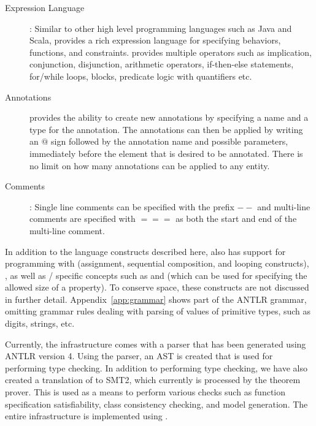 \begin{description}
\item [Expression Language]: Similar to other high level programming
  languages such as Java and Scala, \Klang{} provides a rich
  expression language for specifying behaviors, functions, and
  constraints. \Klang{} provides multiple operators such as
  implication, conjunction, disjunction, arithmetic operators,
  if-then-else statements, for/while loops, blocks, predicate logic
  with quantifiers etc. 

\item [Annotations] \Klang{} provides the ability to create new
  annotations by specifying a name and a type for the annotation. The
  annotations can then be applied by writing an $@$ sign followed by
  the annotation name and possible parameters, immediately before the 
  element that is desired to be annotated. There is no limit on how many 
  annotations can be applied to any entity. 

\item [Comments]: Single line comments can be specified with the
  prefix $--$ and multi-line comments are specified with $===$ as both
  the start and end of the multi-line comment.

\end{description}

In addition to the language constructs described here, \Klang{} also
has support for programming with  
(assignment, sequential composition, and looping constructs), 
, as well as \sysml{}/\uml{} specific concepts such as  and  (which can be used for specifying the allowed size of a property). 
To conserve space, these constructs are not discussed in further detail. 
Appendix~\ref{app:grammar} shows
part of the \Klang{} ANTLR grammar, omitting 
grammar rules dealing with parsing of values of primitive types, such as digits, strings, etc.

Currently, the \Klang{} infrastructure comes with a parser that has
been generated using ANTLR version 4. Using the parser, an AST is
created that is used for performing type checking. In addition to
performing type checking, we have also created a translation of
\Klang{} to SMT2, which currently is processed by the \zthree{} theorem prover.
This is used as a means to perform various checks
such as function specification satisfiability, class consistency
checking, and model generation. The entire \Klang{} infrastructure is
implemented using \scala.

 

